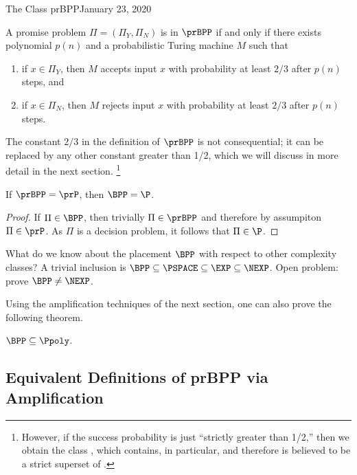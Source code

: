 \begin{lecture}{1}{The Class prBPP}{January 23, 2020}
\begin{definition}[$\prBPP$]
  A promise problem $\Pi = (\Pi_Y, \Pi_N)$ is in $\prBPP$ if and only if there
  exists polynomial $p(n)$ and a probabilistic Turing machine $M$ such that
  \begin{enumerate}
    \item if $x \in \Pi_Y$, then $M$ accepts input $x$ with probability at
      least $2/3$ after $p(n)$ steps, and
    \item if $x \in \Pi_N$, then $M$ rejects input $x$ with probability at
      least $2/3$ after $p(n)$ steps.
  \end{enumerate}
\end{definition}

The constant $2/3$ in the definition of $\prBPP$ is not consequential; it
can be replaced by any other constant greater than 1/2, which we will discuss
in more detail in the next section.%
\footnote{However, if the success probability is just ``strictly greater than
  1/2,'' then we obtain the class \PP, which contains, in particular, \NP and
  therefore is believed to be a strict superset of \BPP.}

\begin{proposition}
  If $\prBPP = \prP$, then $\BPP = \P$.
\end{proposition}

\begin{proof}
  If $\Pi \in \BPP$, then trivially $\Pi \in \prBPP$ and therefore by
  assumpiton $\Pi \in \prP$. As $\Pi$ is a decision problem, it follows
  that $\Pi \in \P$.
\end{proof}

What do we know about the placement $\BPP$ with respect to other complexity
classes? A trivial inclusion is $\BPP \subseteq \PSPACE \subseteq \EXP
\subseteq \NEXP$. Open problem: prove $\BPP \ne \NEXP$.

Using the amplification techniques of the next section, one can also prove
the following theorem.

\begin{theorem}
  $\BPP \subseteq \Ppoly$.
\end{theorem}

\subsection{Equivalent Definitions of prBPP via Amplification}



\end{lecture}
